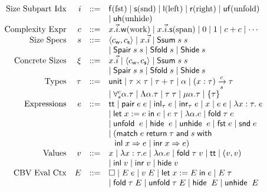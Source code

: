 \documentclass[preprint]{sigplanconf}
\newcommand{\thide}[1]{\left \{ #1 \right \}}
\newcommand{\arrow}[4]{#1\xrightarrow[#3]{#2}#4}
\newcommand{\symlet}{\mathsf{let\;}}
\newcommand{\symin}{\mathsf{\;in\;}}
\newcommand{\symand}{\mathsf{\;and\;}}
\newcommand{\symmatch}{\mathsf{match}}
\newcommand{\symwith}{\mathsf{\;with\;}}
\newcommand{\symreturn}{\mathsf{\;return\;}}
\newcommand{\syminl}{\mathsf{inl}}
\newcommand{\syminr}{\mathsf{inr}}
\newcommand{\symfold}{\mathsf{fold\;}}
\newcommand{\symSfold}{\mathsf{Sfold}}
\newcommand{\symunfold}{\mathsf{unfold\;}}
\newcommand{\symhide}{\mathsf{hide\;}}
\newcommand{\symShide}{\mathsf{Shide}}
\newcommand{\symunhide}{\mathsf{unhide\;}}
\newcommand{\sympair}{\mathsf{pair}}
\newcommand{\symtt}{\mathsf{tt}}
\newcommand{\symunit}{\mathsf{unit}}
\newcommand{\intro}[2]{(#1 : #2)}
\newcommand{\symfst}{\mathsf{fst}}
\newcommand{\symsnd}{\mathsf{snd}}
\newcommand{\symuf}{\mathsf{uf}}
\newcommand{\symuh}{\mathsf{uh}}
\newcommand{\syml}{\mathsf{l}}
\newcommand{\symr}{\mathsf{r}}
\newcommand{\symf}{\mathsf{f}}
\newcommand{\syms}{\mathsf{s}}
\newcommand{\symSpair}{\mathsf{Spair}}
\newcommand{\symSlr}{\mathsf{Ssum}}
\newcommand{\symwork}{\mathsf{w}}
\newcommand{\symspan}{\mathsf{s}}
\newcommand{\Sstats}[1]{\left \langle #1 \right \rangle}
\begin{document}
\begin{figure}
$$\begin{array}{rrcl}
  \textrm{Size Subpart Idx} & i &::=& \symf \textrm{(fst)} \mid \syms \textrm{(snd)} \mid \syml \textrm{(left)} \mid \symr \textrm{(right)} \mid \symuf \textrm{(unfold)} \\
  & & & \mid \symuh \textrm{(unhide)} \\
  \textrm{Complexity Expr} & c &::=& x.\vec{i}.\symwork \textrm{(work)} \mid x.\vec{i}.\symspan \textrm{(span)} \mid 0 \mid 1 \mid c+c \mid \cdots \\
  \textrm{Size Specs} & s &::=& \Sstats{c_\symwork,c_\symspan} \mid x.\vec{i} \mid \symSlr\;s\;s \\
  & & & \mid \symSpair\;s\;s \mid \symSfold\;s \mid \symShide\;s \\
  \textrm{Concrete Sizes} & \xi &::=& x.\vec{i} \mid \Sstats{c_\symwork,c_\symspan} \mid \symSlr\;s\;s \\
  & & & \mid \symSpair\;s\;s \mid \symSfold\;s \mid \symShide\;s \\
  \textrm{Types} & \tau &::=& \symunit \mid \tau\times\tau \mid \tau+\tau \mid \alpha \mid \arrow{\intro{x}{\tau}}{c}{s}{\tau} \\
  & & & \mid \forall^c_s \alpha.\tau \mid \Lambda \alpha.\tau \mid \tau\;\tau \mid \mu \alpha.\tau \mid \thide\tau \\
  \textrm{Expressions} & e &::=& \symtt \mid \sympair\;e\;e \mid \syminl_\tau\;e \mid \syminr_\tau\;e \mid x \mid e\;e \mid \lambda x:\tau.\;e \\
  & & & \mid \symlet x := e \symin e \mid e\;\tau \mid \lambda \alpha.e \mid \symfold\tau\;e \\
  & & & \mid \symunfold\;e \mid \symhide\;e \mid \symunhide\;e \mid \symfst\;e \mid \symsnd\;e \\
  & & & \mid (\symmatch\;e \symreturn \tau \symand s \symwith \\
  & & & \hspace{.1in} \syminl\;x\Rightarrow e\;|\;\syminr\;x\Rightarrow e) \\
  \textrm{Values} & v &::=& x \mid \lambda x:\tau.e \mid \lambda \alpha.e \mid \symfold\tau\;v \mid \symtt \mid (v,v) \\
  & & & \mid \syminl\;v \mid \syminr\;v \mid \symhide v \\
  \textrm{CBV Eval Ctx} & E &::=& \Box \mid E\;e \mid v\;E \mid \symlet x := E\symin e \mid E\;\tau \\
  & & & \mid \symfold\tau\;E \mid \symunfold\tau\;E \mid \symhide\;E \mid \symunhide\;E \\

\end{array}$$
\end{figure}
\end{document}
